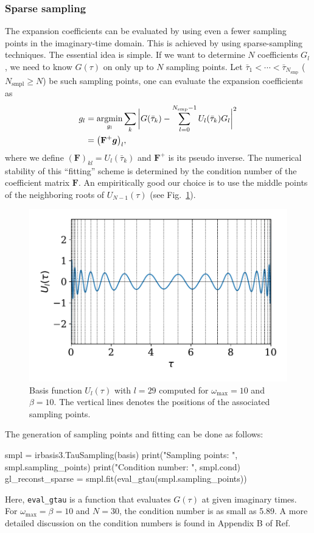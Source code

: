 \documentclass[submission, LectureNotes]{SciPost}
\newcommand{\wmax}{\ensuremath{{\omega_\mathrm{max}}}}
\newcommand{\tauk}{\ensuremath{\bar{\tau}_k}}
\newcommand{\Fmat}{{\mathbf{F}}}
\begin{document}
\subsubsection{Sparse sampling}
The expansion coefficients can be evaluated by using even a fewer sampling points in the imaginary-time domain.
This is achieved by using sparse-sampling techniques.
The essential idea is simple.
If we want to determine $N$ coefficients $G_l$,
we need to know $G(\tau)$ on only up to $N$ sampling points.
Let $\bar{\tau}_1 < \cdots < \bar{\tau}_{N_\mathrm{smp}}$ ($N_\mathrm{smpl}\ge N$) be such sampling points,
one can evaluate the expansion coefficients as
\begin{align}
    g_l &= \underset{g_l}{\mathrm{argmin}}
        \sum_k \bigg| G(\tauk) - \sum_{l=0}^{N_\mathrm{smp}-1} U_l(\tauk)G_l \bigg|^2\nonumber \\
    &= \pqty{\Fmat^+ \boldsymbol{g}}_l,\label{eq:fittau}
\end{align}
where we define $(\Fmat)_{kl} = U_l(\tauk)$ and $\Fmat^+$ is its pseudo inverse.
The numerical stability of this ``fitting'' scheme is determined
by the condition number of the coefficient matrix $\Fmat$.
An empiritically good our choice is to use the middle points of the neighboring roots of 
$U_{N-1}(\tau)$ (see Fig.~\ref{fig:sampling_points_tau}).
\begin{figure}
    \centering
    \includegraphics[width=0.6\columnwidth]{sampling_points_tau.pdf}
    \caption{
    Basis function $U_l(\tau)$ with $l=29$ computed for $\wmax=10$ and $\beta=10$.
    The vertical lines denotes the positions of the associated sampling points.
    }
    \label{fig:sampling_points_tau}
\end{figure}
The generation of sampling points and fitting can be done as follows:
\begin{python}
smpl = irbasis3.TauSampling(basis)
print("Sampling points: ", smpl.sampling_points)
print("Condition number: ", smpl.cond)
gl_reconst_sparse = smpl.fit(eval_gtau(smpl.sampling_points))
\end{python}
Here, \texttt{eval\_gtau} is a function that evaluates $G(\tau)$ at given imaginary times.
For $\wmax=\beta=10$ and $N=30$, the condition number is as small as 5.89.
A more detailed discussion on the condition numbers is found in Appendix B of Ref.~\cite{shinaoka2021efficient}
\end{document}
